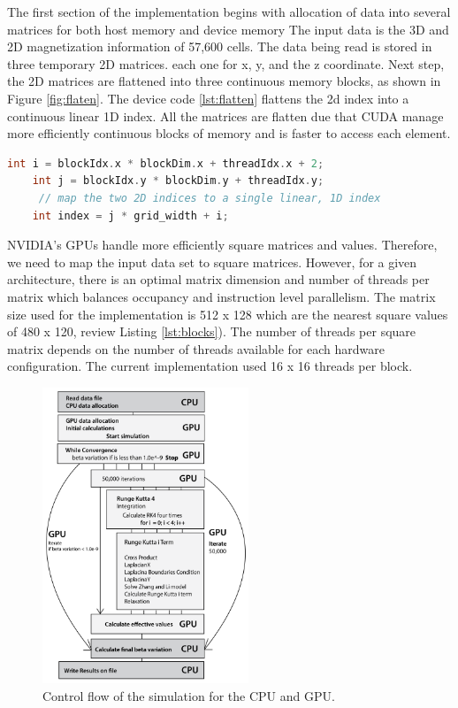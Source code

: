 The first section of the implementation begins with allocation of data into several matrices for both host memory and device memory The input data is the 3D and 2D magnetization information of 57,600 cells. The data being read is stored in three temporary 2D matrices. each one for x, y, and the z coordinate. Next step, the 2D matrices are flattened into three continuous memory blocks, as shown in Figure \ref{fig:flaten}. The device code \ref{lst:flatten} flattens the 2d index into a continuous linear 1D index. All the matrices are flatten due that CUDA manage more efficiently continuous blocks of memory and is faster to access each element.

\begin{lstlisting}[language=C++, label={lst:flatten}, caption={Kernel flatten 2d - 1d}]	
    int i = blockIdx.x * blockDim.x + threadIdx.x + 2;
    int j = blockIdx.y * blockDim.y + threadIdx.y;
     // map the two 2D indices to a single linear, 1D index
    int index = j * grid_width + i; 
\end{lstlisting}


NVIDIA's GPUs handle more efficiently square matrices and values. Therefore, we need to map the input data set to square matrices. However, for a given architecture, there is an optimal matrix dimension and number of threads per matrix which balances occupancy and instruction level parallelism.  The matrix size used for the implementation is 512 x 128 which are the nearest square values of 480 x 120, review Listing  \ref{lst:blocks}). The number of threads per square matrix depends on the number of threads available for each hardware configuration. The current implementation used 16 x 16 threads per block.
 
\begin{figure}[htbp]
	\centering
		\includegraphics[width=0.55\textwidth]{Figures/flow.png}
		\smallskip
	\caption[Control flow]{Control flow of the simulation for the CPU and GPU.}
	\label{fig:flow}
\end{figure}

